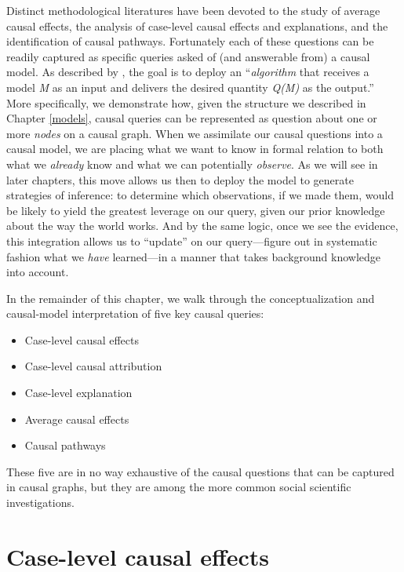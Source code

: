 \documentclass[
  12pt,
]{book}
\begin{document}
Distinct methodological literatures have been devoted to the study of average causal effects, the analysis of case-level causal effects and explanations, and the identification of causal pathways. Fortunately each of these questions can be readily captured as specific queries asked of (and answerable from) a causal model. As described by \citet{judea2010introduction}, the goal is to deploy an ``\emph{algorithm} that receives a model \emph{M} as an input and delivers the desired quantity \emph{Q(M)} as the output.'' More specifically, we demonstrate how, given the structure we described in Chapter \ref{models}, causal queries can be represented as question about one or more \emph{nodes} on a causal graph. When we assimilate our causal questions into a causal model, we are placing what we want to know in formal relation to both what we \emph{already} know and what we can potentially \emph{observe}. As we will see in later chapters, this move allows us then to deploy the model to generate strategies of inference: to determine which observations, if we made them, would be likely to yield the greatest leverage on our query, given our prior knowledge about the way the world works. And by the same logic, once we see the evidence, this integration allows us to ``update'' on our query---figure out in systematic fashion what we \emph{have} learned---in a manner that takes background knowledge into account.

In the remainder of this chapter, we walk through the conceptualization and causal-model interpretation of five key causal queries:

\begin{itemize}
\item
  Case-level causal effects
\item
  Case-level causal attribution
\item
  Case-level explanation
\item
  Average causal effects
\item
  Causal pathways
\end{itemize}

These five are in no way exhaustive of the causal questions that can be captured in causal graphs, but they are among the more common social scientific investigations.

\hypertarget{case-level-causal-effects}{%
\section{Case-level causal effects}\label{case-level-causal-effects}}
\end{document}
